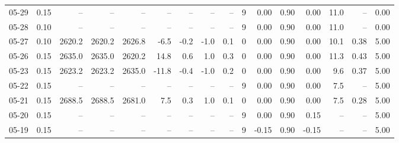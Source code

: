 \begin{threeparttable}
{\begin{tabular}{lrrrrrrrrrrrrrrr}
  05-29 &     0.15 &     -- &     -- &     -- &         -- &             -- &                       -- &                  -- &              9 &       0.00 &      0.90 &           0.00 &             11.0 &              -- &                   0.00 \\
  05-28 &     0.10 &     -- &     -- &     -- &         -- &             -- &                       -- &                  -- &              9 &       0.00 &      0.90 &           0.00 &             11.0 &              -- &                   0.00 \\
  05-27 &     0.10 & 2620.2 & 2620.2 & 2626.8 &       -6.5 &           -0.2 &                     -1.0 &                 0.1 &              0 &       0.00 &      0.90 &           0.00 &             10.1 &            0.38 &                   5.00 \\
  05-26 &     0.15 & 2635.0 & 2635.0 & 2620.2 &       14.8 &            0.6 &                      1.0 &                 0.3 &              0 &       0.00 &      0.90 &           0.00 &             11.3 &            0.43 &                   5.00 \\
  05-23 &     0.15 & 2623.2 & 2623.2 & 2635.0 &      -11.8 &           -0.4 &                     -1.0 &                 0.2 &              0 &       0.00 &      0.90 &           0.00 &              9.6 &            0.37 &                   5.00 \\
  05-22 &     0.15 &     -- &     -- &     -- &         -- &             -- &                       -- &                  -- &              9 &       0.00 &      0.90 &           0.00 &              7.5 &              -- &                   5.00 \\
  05-21 &     0.15 & 2688.5 & 2688.5 & 2681.0 &        7.5 &            0.3 &                      1.0 &                 0.1 &              0 &       0.00 &      0.90 &           0.00 &              7.5 &            0.28 &                   5.00 \\
  05-20 &     0.15 &     -- &     -- &     -- &         -- &             -- &                       -- &                  -- &              9 &       0.00 &      0.90 &           0.15 &               -- &              -- &                   5.00 \\
  05-19 &     0.15 &     -- &     -- &     -- &         -- &             -- &                       -- &                  -- &              9 &      -0.15 &      0.90 &          -0.15 &               -- &              -- &                   5.00 \\

\end{tabular}}
\end{threeparttable}
